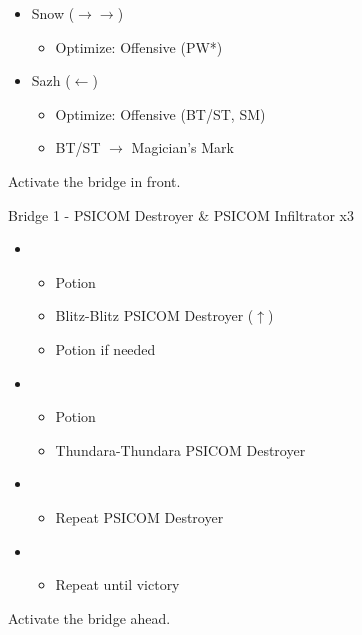\begin{multicols}{2}
\begin{menu}
\begin{itemize}
\begin{itemize}
\begin{itemize}
              \end{itemize}
        \item Snow ($\rightarrow\rightarrow$)
              \begin{itemize}
                \item Optimize: Offensive (PW*)
              \end{itemize}
        \item Sazh ($\leftarrow$)
              \begin{itemize}
                \item Optimize: Offensive (BT/ST, SM)
                \item BT/ST $\rightarrow$ Magician's Mark
              \end{itemize}
      \end{itemize}
    \end{itemize}
  \end{menu}

  Activate the bridge in front.

  \begin{battle}[0:28]{Bridge 1 - PSICOM Destroyer \& PSICOM Infiltrator x3}
    \begin{itemize}
      \item \first
            \begin{itemize}
              \item Potion
              \item Blitz-Blitz PSICOM Destroyer ($\uparrow$)
              \item Potion if needed
            \end{itemize}
      \item \second
            \begin{itemize}
              \item Potion
              \item Thundara-Thundara PSICOM Destroyer
            \end{itemize}
      \item \first
            \begin{itemize}
              \item Repeat PSICOM Destroyer
            \end{itemize}
      \item \fifth
            \begin{itemize}
              \item Repeat until victory
            \end{itemize}
    \end{itemize}
      
  \end{battle}
  Activate the bridge ahead.
  \vfill


\end{multicols}
